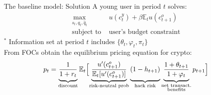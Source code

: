 \documentclass{beamer}
\begin{document}
\begin{frame}{The baseline model: Solution}
A young user in period $t$ solves:
\begin{align}
\max_{s_t, q_t, \hat{q}_t} &u(c_t^y) + \beta\mathbb{E}_t u(c_{t+1}^o)\\  
    \text{subject to  } & \text{user's budget constraint} \nonumber
\end{align}
$^*$ Information set at period $t$ includes $ \{\theta_t, \varphi_t, \pi_t\}$ \\
From FOCs obtain the equilibrium pricing equation for crypto:
\newcommand{\vp}{\vphantom{\frac{u'(c_{t+1}^o)}{\mathbb{E}_t[u'(c_{t+1}^o)]}}}
\begin{equation}
    p_t = 
    \underbrace{\vp
    \frac{1}{1+r_t}}_\text{discount}
    \mathbb{E}_t \Bigl[ 
    \underbrace{\frac{u'(c_{t+1}^o)}{\mathbb{E}_t[u'(c_{t+1}^o)]}} _\text{risk-neutral prob}
    \underbrace{\vp
    (1-h_{t+1})} _\text{hack risk}
    \underbrace{\vp
    \frac{1+\theta_{t+1}}{1+\varphi_t}} _{\substack{\text{net transact.}\\ \text{benefits}}}
     p_{t+1}
    \Bigr]
\end{equation}    
\end{frame}


\end{document}
